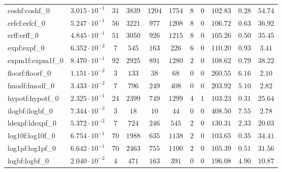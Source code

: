 \begin{tabular}{|l|c|c|c|c|c|c|c|c|c|c|}
coshf:coshf\_0               & $ 3.015 \cdot 10^{-1} $ & $ 31     $ & $ 3839  $ & $ 1204  $ & $ 1754  $ & $ 8   $ & $ 0 $ & $ 102.83      $ & $ 0.28    $ & $ 54.74   $ \\
erfcf:erfcf\_0               & $ 5.247 \cdot 10^{-1} $ & $ 56     $ & $ 3221  $ & $ 977   $ & $ 1208  $ & $ 8   $ & $ 0 $ & $ 106.72      $ & $ 0.63    $ & $ 36.92   $ \\
erff:erff\_0                 & $ 4.845 \cdot 10^{-1} $ & $ 51     $ & $ 3050  $ & $ 926   $ & $ 1215  $ & $ 8   $ & $ 0 $ & $ 105.26      $ & $ 0.50    $ & $ 35.45   $ \\
expf:expf\_0                 & $ 6.352 \cdot 10^{-2} $ & $ 7      $ & $ 545   $ & $ 163   $ & $ 226   $ & $ 6   $ & $ 0 $ & $ 110.20      $ & $ 0.93    $ & $ 3.41    $ \\
expm1f:expm1f\_0             & $ 8.470 \cdot 10^{-1} $ & $ 92     $ & $ 2925  $ & $ 891   $ & $ 1280  $ & $ 2   $ & $ 0 $ & $ 108.62      $ & $ 0.79    $ & $ 38.22   $ \\
floorf:floorf\_0             & $ 1.151 \cdot 10^{-2} $ & $ 3      $ & $ 133   $ & $ 38    $ & $ 68    $ & $ 0   $ & $ 0 $ & $ 260.55      $ & $ 6.16    $ & $ 2.10    $ \\
fmodf:fmodf\_0               & $ 3.433 \cdot 10^{-2} $ & $ 7      $ & $ 796   $ & $ 249   $ & $ 408   $ & $ 0   $ & $ 0 $ & $ 203.92      $ & $ 5.10    $ & $ 2.82    $ \\
hypotf:hypotf\_0             & $ 2.325 \cdot 10^{-1} $ & $ 24     $ & $ 2399  $ & $ 749   $ & $ 1299  $ & $ 4   $ & $ 1 $ & $ 103.23      $ & $ 0.31    $ & $ 25.64   $ \\
ilogbf:ilogbf\_0             & $ 7.344 \cdot 10^{-3} $ & $ 3      $ & $ 18    $ & $ 10    $ & $ 44    $ & $ 0   $ & $ 0 $ & $ 408.50      $ & $ 7.55    $ & $ 2.78    $ \\
ldexpf:ldexpf\_0             & $ 5.372 \cdot 10^{-2} $ & $ 7      $ & $ 724   $ & $ 246   $ & $ 545   $ & $ 2   $ & $ 0 $ & $ 130.31      $ & $ 2.33    $ & $ 20.03   $ \\
log10f:log10f\_0             & $ 6.754 \cdot 10^{-1} $ & $ 70     $ & $ 1988  $ & $ 635   $ & $ 1138  $ & $ 2   $ & $ 0 $ & $ 103.65      $ & $ 0.35    $ & $ 34.41   $ \\
log1pf:log1pf\_0             & $ 6.642 \cdot 10^{-1} $ & $ 70     $ & $ 2463  $ & $ 755   $ & $ 1100  $ & $ 2   $ & $ 0 $ & $ 105.39      $ & $ 0.51    $ & $ 31.56   $ \\
logbf:logbf\_0               & $ 2.040 \cdot 10^{-2} $ & $ 4      $ & $ 471   $ & $ 163   $ & $ 391   $ & $ 0   $ & $ 0 $ & $ 196.08      $ & $ 4.90    $ & $ 10.87   $ \\

\end{tabular}
